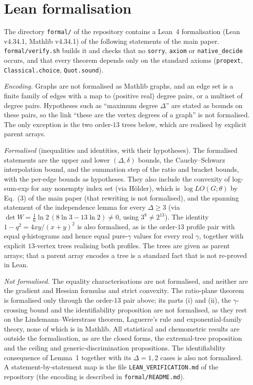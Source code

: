 \documentclass[a5paper, 10pt]{article}
\theoremstyle{plain}
\theoremstyle{remark}
\theoremstyle{definition}
\begin{document}
\section{Lean formalisation}\label{sec:s-lean}

The directory \texttt{formal/} of the repository contains a Lean~4
formalisation (Lean v4.34.1, Mathlib v4.34.1) of the following
statements of the main paper. \texttt{formal/verify.sh} builds it and
checks that no \texttt{sorry}, \texttt{axiom} or \texttt{native\_decide}
occurs, and that every theorem depends only on the standard
axioms (\texttt{propext}, \texttt{Classical.choice}, \texttt{Quot.sound}).

\emph{Encoding.} Graphs are not formalised as Mathlib graphs, and an edge
set is a finite family of edges with a map to (positive real) degree
pairs, or a multiset of degree pairs. Hypotheses such as ``maximum degree
$\Delta$'' are stated as bounds on these pairs, so the link ``these are
the vertex degrees of a graph'' is not formalised. The only
exception is the two order-$13$ trees below, which are realised by
explicit parent arrays.

\emph{Formalised} (inequalities and identities, with their hypotheses).
The formalised statements are the upper and lower $(\Delta,\delta)$
bounds, the Cauchy--Schwarz interpolation bound, and the summation step
of the ratio and bracket bounds, with the per-edge bounds as
hypotheses. They also include the convexity of log-sum-exp for any
nonempty index set (via H\"older), which is $\log LO(G;\theta)$ by
Eq.~(3) of the main paper (that rewriting is not formalised), and the
spanning statement of the independence lemma for
every $\Delta \ge 3$ (via $\det W = \tfrac16\ln 2\,(8\ln 3 - 13\ln 2)
\neq 0$, using $3^8 \neq 2^{13}$). The identity
$1 - q^2 = 4xy/(x+y)^2$ is also formalised, as is the order-$13$ profile
pair with equal $q$-histograms and hence equal pure-$\gamma$ values
for every real $\gamma$, together with explicit $13$-vertex trees
realising both profiles. The trees are given as parent arrays; that a
parent array encodes a tree is a standard fact that is not re-proved
in Lean.

\emph{Not formalised.} The equality characterisations are not
formalised, and neither are the gradient and Hessian formulas and strict
convexity. The ratio-plane theorem is formalised only through the
order-$13$ pair above; its parts (i) and (ii), the $\gamma$-crossing bound and
the identifiability proposition are not formalised, as they rest on
the Lindemann--Weierstrass theorem, Laguerre's rule and
exponential-family theory, none of which is in Mathlib. All
statistical and chemometric results are outside the formalisation, as
are the closed forms, the extremal-tree proposition and the
ceiling and generic-discrimination propositions. The identifiability
consequence of Lemma~1 together with its $\Delta = 1, 2$ cases is
also not formalised. A statement-by-statement map is the file
\texttt{LEAN\_VERIFICATION.md} of the repository (the encoding is
described in \texttt{formal/README.md}).
\end{document}
